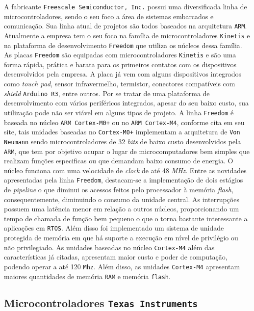A fabricante \texttt{Freescale Semiconductor, Inc.} possui uma diversificada linha de microcontroladores, sendo o seu foco a área de sistemas embarcados e comunicação. Sua linha atual de projetos são todos baseados na arquitetura \texttt{ARM}. Atualmente a empresa tem o seu foco na família de microcontroladores \texttt{Kinetis} e na plataforma de desenvolvimento \texttt{Freedom} que utiliza os núcleos dessa família.
As placas \texttt{Freedom} são equipadas com microcontroladores \texttt{Kinetis} e são uma forma rápida, prática e barata para os primeiros contatos com os dispositivos desenvolvidos pela empresa. A placa já vem com alguns dispositivos integrados como \textit{touch pad}, sensor infravermelho, termistor, conectores compatíveis com \textit{shield} \texttt{Arduino R3}, entre outros. Por se tratar de uma plataforma de desenvolvimento com vários periféricos integrados, apesar do seu baixo custo, sua utilização pode não ser viável em alguns tipos de projeto. A linha \texttt{Freedom} é baseada no núcleo \texttt{ARM Cortex-M0+} ou no \texttt{ARM Cortex-M4}, conforme cita \cite{lima} em seu site, tais unidades baseadas no \texttt{Cortex-M0+} implementam a arquitetura de \texttt{Von Neumann} sendo microcontroladores de 32 \textit{bits} de baixo custo desenvolvidos pela \texttt{ARM}, que tem por objetivo ocupar o lugar de microcomputadores bem simples que realizam funções especificas ou que demandam baixo consumo de energia. O núcleo funciona com uma velocidade de \textit{clock} de até 48 \textit{MHz}. Entre as novidades apresentadas pela linha \texttt{Freedom}, destacam-se a implementação de dois estágios de \textit{pipeline} o que diminui os acessos feitos pelo processador à memória \textit{flash}, consequentemente, diminuindo o consumo da unidade central. As interrupções possuem uma latência menor em relação a outros núcleos, proporcionando um tempo de chamada de função bem pequeno o que o torna bastante interessante a aplicações em \texttt{RTOS}. Além disso foi implementado um sistema de unidade protegida de memória em que há suporte a execução em nível de privilégio ou não privilegiado. As unidades baseadas no núcleo \texttt{Cortex-M4} além das características já citadas, apresentam maior custo e poder de computação, podendo operar a até 120 \texttt{Mhz}.  Além disso, as unidades \texttt{Cortex-M4} apresentam maiores quantidades de memória \texttt{RAM} e memória \texttt{flash}.

\subsection{Microcontroladores \texttt{Texas Instruments}}

